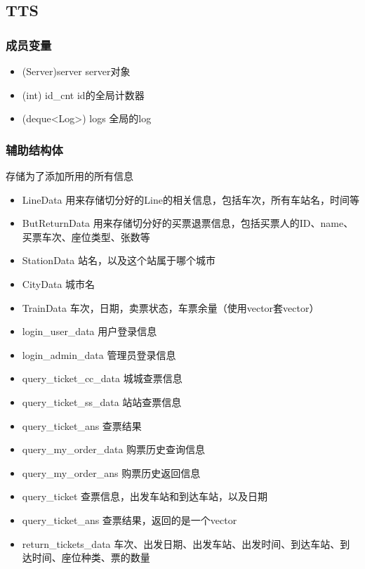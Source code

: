 \subsection{TTS}
    \subsubsection{成员变量}
    \begin{itemize}
    \item (Server)server
    server对象
    \item (int) id_cnt
    id的全局计数器
    \item (deque<Log>) logs
    全局的log
    \end{itemize}
    
    \subsubsection{辅助结构体}
    存储为了添加所用的所有信息
    \begin{itemize}
    \item {LineData}
        用来存储切分好的Line的相关信息，包括车次，所有车站名，时间等
    \item {ButReturnData}
        用来存储切分好的买票退票信息，包括买票人的ID、name、买票车次、座位类型、张数等
    \item {StationData}
        站名，以及这个站属于哪个城市
    \item {CityData}
        城市名
    \item {TrainData}
        车次，日期，卖票状态，车票余量（使用vector套vector）
    \item {login_user_data}
        用户登录信息
    \item {login_admin_data}
        管理员登录信息
    \item {query_ticket_cc_data}
        城城查票信息
    \item {query_ticket_ss_data}
        站站查票信息
    \item {query_ticket_ans}
        查票结果
    \item {query_my_order_data}
        购票历史查询信息
    \item {query_my_order_ans}
        购票历史返回信息
    \item {query_ticket}
        查票信息，出发车站和到达车站，以及日期
    \item {query_ticket_ans}
        查票结果，返回的是一个vector
    \item {return_tickets_data}
        车次、出发日期、出发车站、出发时间、到达车站、到达时间、座位种类、票的数量
    \end{itemize}

